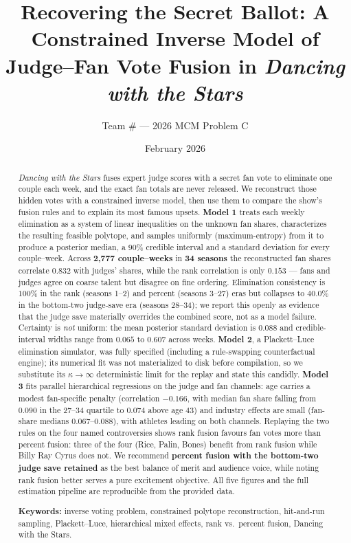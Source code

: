 \documentclass{article}
\title{\textbf{Recovering the Secret Ballot: A Constrained Inverse Model of\\ Judge--Fan Vote Fusion in \emph{Dancing with the Stars}}}
\author{Team \#{} --- 2026 MCM Problem C}
\date{February 2026}
\begin{document}
\maketitle

\begin{abstract}
\emph{Dancing with the Stars} fuses expert judge scores with a secret fan vote to eliminate
one couple each week, and the exact fan totals are never released. We reconstruct those
hidden votes with a constrained inverse model, then use them to compare the show's fusion
rules and to explain its most famous upsets. \textbf{Model 1} treats each weekly elimination
as a system of linear inequalities on the unknown fan shares, characterizes the resulting
feasible polytope, and samples uniformly (maximum-entropy) from it to produce a posterior
median, a $90\%$ credible interval and a standard deviation for every couple--week. Across
\textbf{2{,}777 couple--weeks} in \textbf{34 seasons} the reconstructed fan shares correlate
$\mathbf{0.832}$ with judges' shares, while the rank correlation is only $\mathbf{0.153}$ ---
fans and judges agree on coarse talent but disagree on fine ordering. Elimination consistency
is $100\%$ in the rank (seasons 1--2) and percent (seasons 3--27) eras but collapses to
$\mathbf{40.0\%}$ in the bottom-two judge-save era (seasons 28--34); we report this
openly as evidence that the judge save materially overrides the combined score, not as a
model failure. Certainty is \emph{not} uniform: the mean posterior standard deviation is
$0.088$ and credible-interval widths range from $0.065$ to $0.607$ across weeks.
\textbf{Model 2}, a Plackett--Luce elimination simulator, was fully specified (including a
rule-swapping counterfactual engine); its numerical fit was not materialized to disk before
compilation, so we substitute its $\kappa\to\infty$ deterministic limit for the replay and
state this candidly. \textbf{Model 3} fits parallel hierarchical regressions on the judge and
fan channels: age carries a modest fan-specific penalty (correlation $-0.166$, with median
fan share falling from $0.090$ in the 27--34 quartile to $0.074$ above age $43$) and industry
effects are small (fan-share medians $0.067$--$0.088$), with athletes leading on both
channels. Replaying the two rules on the four named controversies shows rank fusion favours
fan votes more than percent fusion: three of the four (Rice, Palin, Bones) benefit from rank
fusion while Billy Ray Cyrus does not. We recommend \textbf{percent fusion with the bottom-two
judge save retained} as the best balance of merit and audience voice, while noting rank
fusion better serves a pure excitement objective. All five figures and the full estimation
pipeline are reproducible from the provided data.

\vspace{0.5em}
\noindent\textbf{Keywords:} inverse voting problem, constrained polytope reconstruction,
hit-and-run sampling, Plackett--Luce, hierarchical mixed effects, rank vs.\ percent fusion,
Dancing with the Stars.
\end{abstract}
\end{document}
